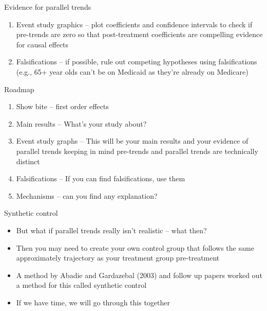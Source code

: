 \documentclass{beamer}
\begin{document}
\begin{frame}{Evidence for parallel trends}

\begin{enumerate}

\item Event study graphics -- plot coefficients and confidence intervals to check if pre-trends are zero so that post-treatment coefficients are compelling evidence for causal effects
\item Falsifications -- if possible, rule out competing hypotheses using falsifications (e.g., 65+ year olds can't be on Medicaid as they're already on Medicare)

\end{enumerate}

\end{frame}

\begin{frame}{Roadmap}

\begin{enumerate}
\item Show bite -- first order effects
\item Main results -- What's your study about?
\item Event study graphs -- This will be your main results and your evidence of parallel trends keeping in mind pre-trends and parallel trends are technically distinct
\item Falsifications -- If you can find falsifications, use them
\item Mechanisms -- can you find any explanation?
\end{enumerate}

\end{frame}

\begin{frame}{Synthetic control}

\begin{itemize}

\item But what if parallel trends really isn't realistic -- what then?
\item Then you may need to create your own control group that follows the same approximately trajectory as your treatment group pre-treatment
\item A method by Abadie and Gardazebal (2003) and follow up papers worked out a method for this called synthetic control
\item If we have time, we will go through this together

\end{itemize}

\end{frame}
\end{document}
